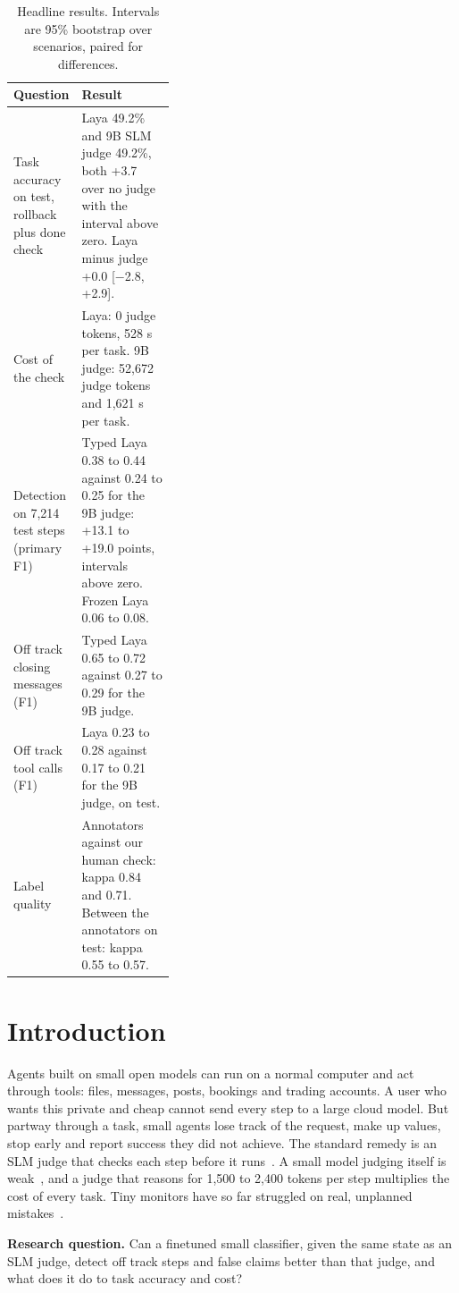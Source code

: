 \documentclass[10pt,a4paper]{article}
\newcommand{\tablestyle}{\footnotesize\rowcolors{2}{rowshade}{white}}
\newcommand{\m}{$-$}
\begin{document}
\begin{table}[H]
\centering\tablestyle
\caption{Headline results. Intervals are 95\% bootstrap over scenarios, paired for differences.}\label{tab:headline}
\begin{tabularx}{\linewidth}{P{0.36\linewidth}Y}
\toprule
\textbf{Question} & \textbf{Result} \\
\midrule
Task accuracy on test, rollback plus done check & Laya 49.2\% and 9B SLM judge 49.2\%, both +3.7 over no judge with the interval above zero. Laya minus judge +0.0 [\m2.8, +2.9]. \\
Cost of the check & Laya: 0 judge tokens, 528 s per task. 9B judge: 52,672 judge tokens and 1,621 s per task. \\
Detection on 7,214 test steps (primary F1) & Typed Laya 0.38 to 0.44 against 0.24 to 0.25 for the 9B judge: +13.1 to +19.0 points, intervals above zero. Frozen Laya 0.06 to 0.08. \\
Off track closing messages (F1) & Typed Laya 0.65 to 0.72 against 0.27 to 0.29 for the 9B judge. \\
Off track tool calls (F1) & Laya 0.23 to 0.28 against 0.17 to 0.21 for the 9B judge, on test. \\
Label quality & Annotators against our human check: kappa 0.84 and 0.71. Between the annotators on test: kappa 0.55 to 0.57. \\
\bottomrule
\end{tabularx}
\end{table}

\section{Introduction}\label{sec:intro}
Agents built on small open models can run on a normal computer and act through tools: files, messages, posts, bookings and trading accounts. A user who wants this private and cheap cannot send every step to a large cloud model. But partway through a task, small agents lose track of the request, make up values, stop early and report success they did not achieve. The standard remedy is an SLM judge that checks each step before it runs~\cite{zheng2023judge}. A small model judging itself is weak~\cite{critictool}, and a judge that reasons for 1,500 to 2,400 tokens per step multiplies the cost of every task. Tiny monitors have so far struggled on real, unplanned mistakes~\cite{realtime}.

\textbf{Research question.} Can a finetuned small classifier, given the same state as an SLM judge, detect off track steps and false claims better than that judge, and what does it do to task accuracy and cost?
\end{document}
